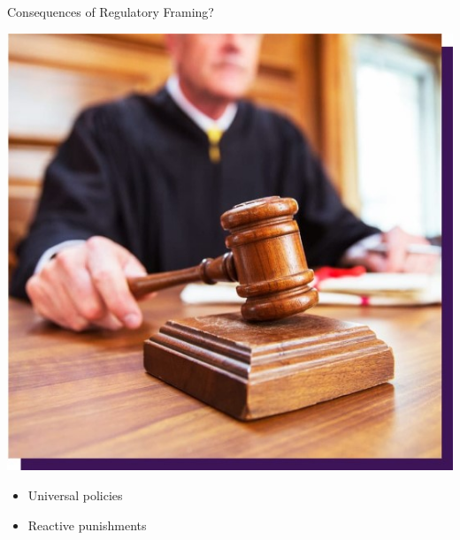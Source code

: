 \documentclass[nobackground,dvipsnames,table]{beamer}
\begin{document}
\begin{frame}{Consequences of Regulatory Framing?}

\vspace{-9ex} %
\hspace{1ex}
\begin{minipage}[c][1ex][t]{0.4\textwidth}
    \includegraphics[scale=0.4]{img/fig8.jpg}
\end{minipage}

\hspace{25ex}
\begin{minipage}[c][2ex][c]{0.5\textwidth}
    \begin{itemize}
        \item Universal policies
        \item Reactive punishments
    \end{itemize} 
\end{minipage}

\end{frame}
\end{document}

